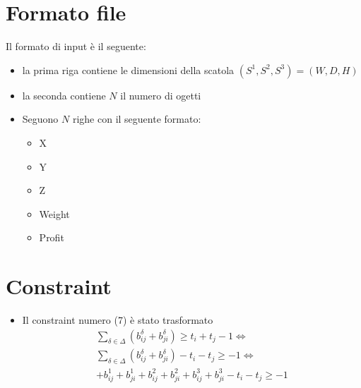 \documentclass{scrartcl}
\begin{document}
\section{Formato file}
Il formato di input è il seguente:
\begin{itemize}
	\item la prima riga contiene le dimensioni della scatola $(S^1, S^2, S^3) = (W, D, H)$
	\item la seconda contiene $N$ il numero di ogetti
	\item Seguono $N$ righe con il seguente formato:
	\begin{itemize}
		\item X 
		\item Y
		\item Z
		\item Weight
		\item Profit
	\end{itemize}
\end{itemize}

\section{Constraint}
\begin{itemize}
	\item 
	Il constraint numero (7) è stato trasformato
	$$
	\begin{array}{l}
	\sum_{\delta \in \Delta}(b_{ij}^\delta + b_{ji}^\delta) \geq t_i + t_j - 1 \iff \\
	\sum_{\delta \in \Delta}(b_{ij}^\delta + b_{ji}^\delta) - t_i - t_j \geq - 1 \iff \\
	+ b_{ij}^1 + b_{ji}^1 + b_{ij}^2 + b_{ji}^2 + b_{ij}^3 + b_{ji}^3 - t_i - t_j \geq  -1
	\end{array}
	$$
\end{itemize}
\end{document}
